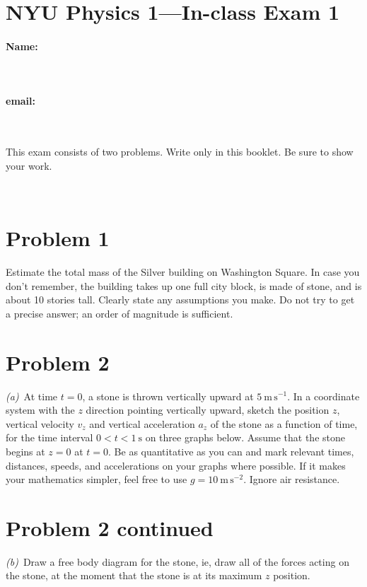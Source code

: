 \documentclass[12pt]{article}
\begin{document}
\section*{NYU Physics 1---In-class Exam 1}

\vfill

\paragraph{Name:} ~

\paragraph{email:} ~

\vfill

This exam consists of two problems.  Write only in this booklet.  Be
sure to show your work.

\vfill ~

\clearpage

\section*{Problem 1}

Estimate the total mass of the Silver building on Washington Square.
In case you don't remember, the building takes up one full city block,
is made of stone, and is about 10 stories tall.  Clearly state any
assumptions you make.  Do not try to get a precise answer; an order of
magnitude is sufficient.

\clearpage

\section*{Problem 2}

\textsl{(a)}~At time $t=0$, a stone is thrown vertically upward at
$5~\mathrm{m\,s^{-1}}$.  In a coordinate system with the $z$ direction
pointing vertically upward, sketch the position $z$, vertical velocity
$v_z$ and vertical acceleration $a_z$ of the stone as a function of
time, for the time interval $0<t<1~\mathrm{s}$ on three graphs below.
Assume that the stone begins at $z=0$ at $t=0$.  Be as quantitative as
you can and mark relevant times, distances, speeds, and accelerations
on your graphs where possible.  If it makes your mathematics simpler,
feel free to use $g= 10~\mathrm{m\,s^{-2}}$.  Ignore air resistance.

\clearpage

\section*{Problem 2 continued}

\textsl{(b)}~Draw a free body diagram for the stone, ie, draw all of
the forces acting on the stone, at the moment that the stone is at its
maximum $z$ position.
\end{document}

